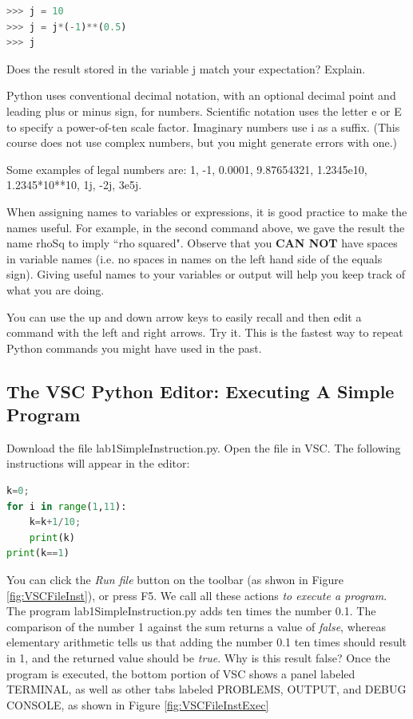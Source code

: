 \begin{lstlisting}[language=Python]
>>> j = 10
>>> j = j*(-1)**(0.5)
>>> j
\end{lstlisting}

Does the result stored in the variable {\s j} match your expectation? Explain. \QA

Python uses conventional decimal notation, with an optional decimal point and leading plus or minus sign, for numbers. Scientific notation uses the letter e or E to specify a power-of-ten scale factor. Imaginary numbers use i as a suffix. (This course does not use complex numbers, but you might generate errors with one.)

Some examples of legal numbers are: 1, -1, 0.0001, 9.87654321, 1.2345e10, 1.2345*10**10, 1j, -2j, 3e5j.  

When assigning names to variables or expressions, it is good practice
to make the names useful. For example, in the second command above,
we gave the result the name rhoSq to imply ``rho squared". Observe
that you {\bf CAN NOT} have spaces in variable names (i.e. no spaces in
names on the left hand side of the equals sign). Giving useful names
to your variables or output will help you keep track
of what you are doing.


You can use the up and down arrow keys to easily recall and then edit a command with the left and right arrows. Try it. This is the fastest way to repeat Python commands you might have used in the past.

\subsection{The VSC Python Editor: Executing A Simple Program}

Download the file {\s lab1SimpleInstruction.py}.  Open the file in VSC.  The following instructions will appear in the editor: 


\begin{lstlisting}[language=Python]
k=0;
for i in range(1,11):
    k=k+1/10;
    print(k)
print(k==1)
\end{lstlisting}

You can click the \textit{Run file} button on the toolbar (as shwon in Figure \ref{fig:VSCFileInst}), or press F5. We call all these actions \textit{to execute a program}. The program {\s lab1SimpleInstruction.py} adds ten times the number 0.1. The comparison of the number 1 against the sum returns a value of \textit{false}, whereas elementary arithmetic tells us that adding the number 0.1 ten times should result in 1, and the returned value should be \textit{true}. Why is this result false? \QA Once the program is executed, the bottom portion of VSC shows a panel labeled TERMINAL, as well as other tabs labeled  PROBLEMS, OUTPUT, and DEBUG CONSOLE, as shown in Figure \ref{fig:VSCFileInstExec}

